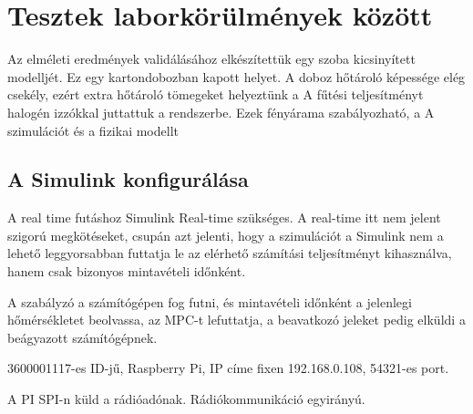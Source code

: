 \chapter{Tesztek laborkörülmények között}

Az elméleti eredmények validálásához elkészítettük egy szoba kicsinyített modelljét. Ez egy kartondobozban kapott helyet. A doboz hőtároló képessége elég csekély, ezért extra hőtároló tömegeket helyeztünk a 
A fűtési teljesítményt halogén izzókkal juttattuk a rendszerbe. Ezek fényárama szabályozható, a 
A szimulációt és a fizikai modellt

\section{A Simulink konfigurálása}
A real time futáshoz Simulink  Real-time szükséges. A real-time itt nem jelent szigorú megkötéseket, csupán azt jelenti, hogy a szimulációt a Simulink nem a lehető leggyorsabban futtatja le az elérhető számítási teljesítményt kihasználva, hanem csak bizonyos mintavételi időnként. 


A szabályzó a számítógépen fog futni, és mintavételi időnként a jelenlegi hőmérsékletet beolvassa, az MPC-t lefuttatja, a beavatkozó jeleket pedig elküldi a beágyazott számítógépnek.




3600001117-es ID-jű, Raspberry Pi, IP címe fixen 192.168.0.108, 54321-es port.

A PI SPI-n küld a rádióadónak.
Rádiókommunikáció egyirányú.